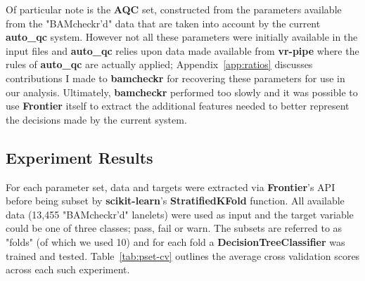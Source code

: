 Of particular note is the \textbf{AQC} set, constructed from the parameters
available from the "BAMcheckr'd" data that are taken into account by the
current \textbf{auto\_qc} system. However not all these
parameters were initially available in the input files and \textbf{auto\_qc}
relies upon data made available from \textbf{vr-pipe} where the rules of
\textbf{auto\_qc} are actually applied; Appendix~\ref{app:ratios} discusses
contributions I made to \textbf{bamcheckr} for recovering these parameters for
use in our analysis. Ultimately, \textbf{bamcheckr} performed too slowly and it
was possible to use \textbf{Frontier} itself to extract the additional features
needed to better represent the decisions made by the current system.

\subsection{Experiment Results}
For each parameter set, data and targets were extracted via \textbf{Frontier}'s
API before being subset by \textbf{scikit-learn}'s \textbf{StratifiedKFold}
function. All available data (13,455 "BAMcheckr'd" lanelets) were used as input
and the target variable could be one of three classes; pass, fail or warn.
The subsets are referred to as "folds" (of which we used 10) and for
each fold a \textbf{DecisionTreeClassifier} was trained and tested.
Table~\ref{tab:pset-cv} outlines the average cross validation scores across each
such experiment.

